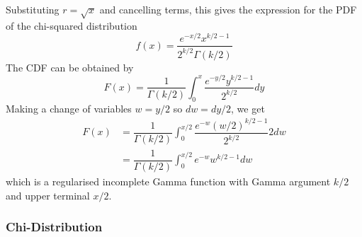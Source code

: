 \documentclass[11pt]{report} %
\begin{document}
Substituting $r = \sqrt{x}$ and cancelling terms, this gives the expression for the PDF of the chi-squared distribution
\begin{equation}
f\left(x\right) = \dfrac{e^{-x/2}x^{k/2 - 1}}{2^{k/2}\Gamma\left(k/2\right)}
\end{equation}
The CDF can be obtained by
\begin{equation}
F\left(x\right) = \dfrac{1}{\Gamma\left(k/2\right)}\int_{0}^{x}\dfrac{e^{-y/2}y^{k/2-1}}{2^{k/2}}dy
\end{equation}
Making a change of variables $w = y/2$ so $dw = dy/2$, we get
\begin{align}
F\left(x\right) &= \dfrac{1}{\Gamma\left(k/2\right)}\int_{0}^{x/2}\dfrac{e^{-w}\left(w/2\right)^{k/2-1}}{2^{k/2}}2dw \\
&= \dfrac{1}{\Gamma\left(k/2\right)}\int_{0}^{x/2}e^{-w}w^{k/2-1}dw
\end{align}
which is a regularised incomplete Gamma function with Gamma argument $k/2$ and upper terminal $x/2$.

\subsubsection{Chi-Distribution}
\end{document}
